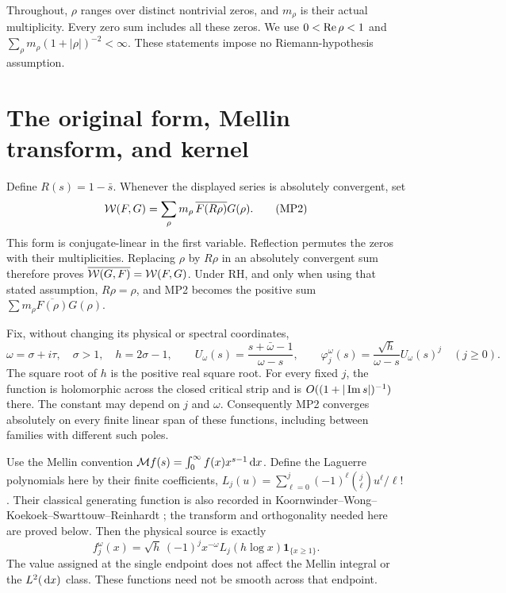 \documentclass[11pt]{article}
\begin{document}
Throughout, $\rho$ ranges over distinct nontrivial zeros, and $m_\rho$ is
their actual multiplicity. Every zero sum includes all these zeros.
We use $0<\operatorname{Re}\rho<1$ and
$\sum_\rho m_\rho(1+|\rho|)^{-2}<\infty$. These statements impose no
Riemann-hypothesis assumption.

\section{The original form, Mellin transform, and kernel}
Define $R(s)=1-\bar s$. Whenever the displayed series is absolutely
convergent, set
\begin{equation}
 \mathcal W(F,G)=\sum_\rho m_\rho\,\overline{F(R\rho)}G(\rho).
 \tag{MP2}
\end{equation}
This form is conjugate-linear in the first variable. Reflection permutes
the zeros with their multiplicities. Replacing $\rho$ by $R\rho$ in an
absolutely convergent sum therefore proves
$\overline{\mathcal W(G,F)}=\mathcal W(F,G)$. Under RH, and only when using that stated
assumption, $R\rho=\rho$, and MP2 becomes the positive sum
$\sum m_\rho\overline{F(\rho)}G(\rho)$.

Fix, without changing its physical or spectral coordinates,
\begin{equation}
 \omega=\sigma+i\tau,\quad \sigma>1,\quad h=2\sigma-1,
 \qquad U_\omega(s)=\frac{s+\bar\omega-1}{\omega-s},\qquad
 \varphi_j^\omega(s)=\frac{\sqrt h}{\omega-s}U_\omega(s)^j
 \quad(j\geq0).\tag{MP3}
\end{equation}
The square root of $h$ is the positive real square root. For every fixed
$j$, the function is holomorphic across the closed critical strip and is
$O((1+|\operatorname{Im} s|)^{-1})$ there. The constant may depend on $j$ and $\omega$.
Consequently MP2 converges absolutely on every finite linear span of
these functions, including between families with different such poles.

Use the Mellin convention $\mathcal Mf(s)=\int_0^\infty f(x)x^{s-1}\,\mathrm d x$.
Define the Laguerre polynomials here by their finite coefficients,
$L_j(u)=\sum_{\ell=0}^j(-1)^\ell\binom j\ell u^\ell/\ell!$.
Their classical generating function is also recorded in
Koornwinder--Wong--Koekoek--Swarttouw--Reinhardt \cite{swpole:Laguerre};
the transform and orthogonality needed here are proved below.
Then the physical source is exactly
\begin{equation}
 f_j^\omega(x)=\sqrt h\,(-1)^j x^{-\omega}L_j(h\log x)
                    \mathbf1_{\{x\geq1\}}.
 \tag{MP4}
\end{equation}
The value assigned at the single endpoint does not affect the Mellin
integral or the $L^2(\,\mathrm d x)$ class. These functions need not be smooth
across that endpoint.
\end{document}
